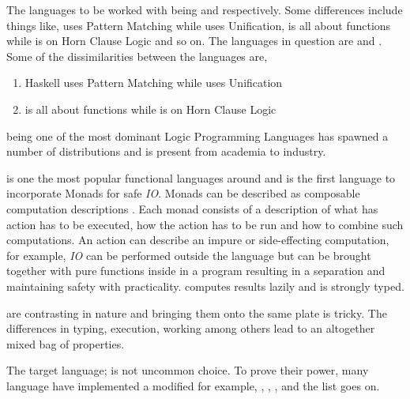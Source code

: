 \documentclass[thesis-solanki.tex]{subfiles}
\begin{document}
The languages to be worked with being  and  respectively.
Some differences include things like,  uses Pattern Matching while  uses
Unification,  is all about functions while  is on Horn Clause Logic and so
on.
The languages in question are  and . Some of the dissimilarities between the languages are,
\begin{enumerate}
\item { Haskell} uses Pattern Matching while  uses Unification

\item {} is all about functions while  is on Horn Clause Logic
\end{enumerate} 

 \cite{wikiprolog}\yyy{}{\Large,} being one of the most dominant Logic Programming
Languages\yyy{}{\Large,} has  
spawned a number of distributions and is present from academia to industry.  

 is one the most popular \cite{website:langpop} functional languages around and is the 
first language to incorporate Monads \cite{wadler1992comprehending} for safe \textit{IO}. Monads can be 
described as composable computation descriptions \cite{website:monadshaskellorg} . Each monad consists of a 
description of what has action has to be executed, how the action has to be run and how to combine such 
computations. An action can describe an impure or side-effecting computation, for example, \textit{IO} can be 
performed outside the language but can be brought together with pure functions inside in a program resulting in a 
separation and maintaining safety with practicality.  computes results lazily and is strongly 
typed. 

 are contrasting in nature\yyy{}{\Large,} and
bringing them onto the same plate is tricky.
The differences in typing, execution, working among others lead to an altogether mixed bag of properties.

The target language;  is not  uncommon choice. To prove their power, many language have implemented \cite{swipembedd} a 
modified  for example,  \cite{racklog},   
\cite{komorowski1982qlog,robinson1982loglisp,robinson1980loglisp},  \cite{wikiprolog, jlog}, 
 \cite{jscriptlog} and the list \cite{yieldprolog} goes on. 
\end{document}

